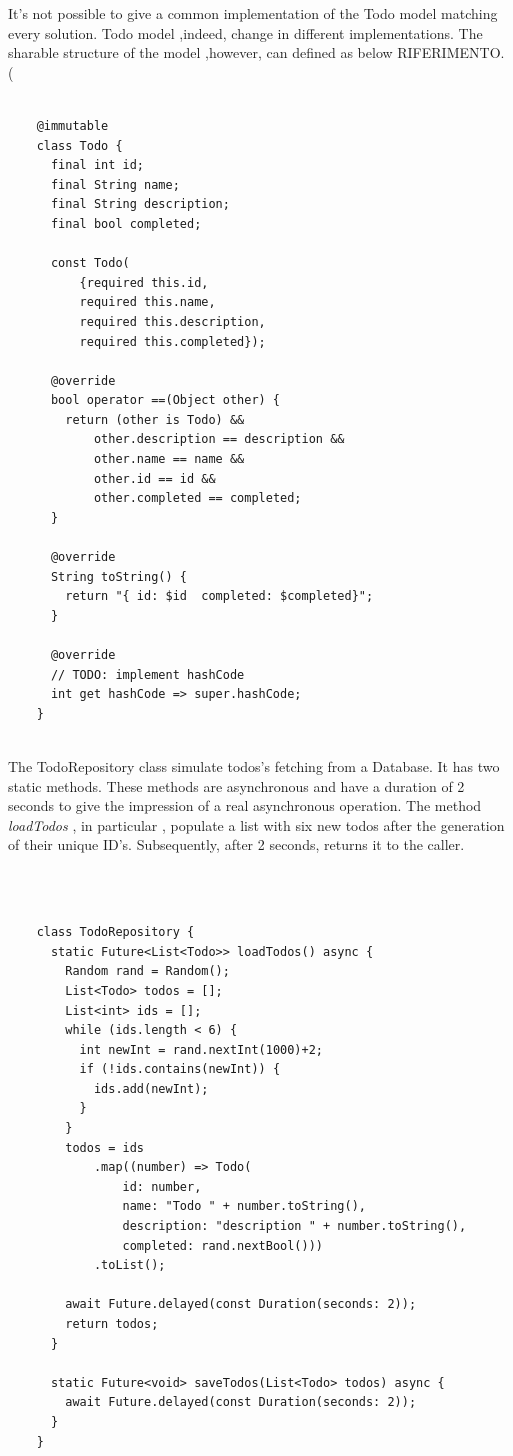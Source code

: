 	\mbox{}
	
It's not possible to give a common implementation of the Todo model matching every solution. Todo model ,indeed, change in different implementations. The sharable structure of the model ,however, can defined as below RIFERIMENTO. (
	\mbox{}\\
	
	 \mbox{}
	\begin{verbatim}
	
	@immutable
	class Todo {
	  final int id;
	  final String name;
	  final String description;
	  final bool completed;
	
	  const Todo(
	      {required this.id,
	      required this.name,
	      required this.description,
	      required this.completed});
	
	  @override
	  bool operator ==(Object other) {
	    return (other is Todo) &&
	        other.description == description &&
	        other.name == name &&
	        other.id == id &&
	        other.completed == completed;
	  }
	
	  @override
	  String toString() {
	    return "{ id: $id  completed: $completed}";
	  }
	
	  @override
	  // TODO: implement hashCode
	  int get hashCode => super.hashCode;
	}
	
	\end{verbatim}
	
	\mbox{}
	
	
The TodoRepository class simulate todos's fetching from a Database. It has two static methods. These methods are asynchronous and have a duration of 2 seconds to give the impression of a real asynchronous operation. The method \textit{loadTodos} , in particular , populate a list with six new todos after the generation of their unique ID's. Subsequently, after 2 seconds, returns it to the caller.
	
	\mbox{}\\
	
	 \mbox{}
	\begin{verbatim}
	
	class TodoRepository {
	  static Future<List<Todo>> loadTodos() async {
	    Random rand = Random();
	    List<Todo> todos = [];
	    List<int> ids = [];
	    while (ids.length < 6) {
	      int newInt = rand.nextInt(1000)+2;
	      if (!ids.contains(newInt)) {
	        ids.add(newInt);
	      }
	    }
	    todos = ids
	        .map((number) => Todo(
	            id: number,
	            name: "Todo " + number.toString(),
	            description: "description " + number.toString(),
	            completed: rand.nextBool()))
	        .toList();
	
	    await Future.delayed(const Duration(seconds: 2));
	    return todos;
	  }
	
	  static Future<void> saveTodos(List<Todo> todos) async {
	    await Future.delayed(const Duration(seconds: 2));
	  }
	}
	
	
	\end{verbatim}
	
